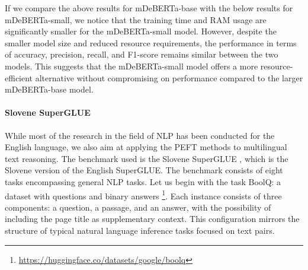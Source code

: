 If we compare the above results for mDeBERTa-base with the below results for mDeBERTa-small, we notice that the training time and RAM usage are significantly smaller for the mDeBERTa-small model. However, despite the smaller model size and reduced resource requirements, the performance in terms of accuracy, precision, recall, and F1-score remains similar between the two models. This suggests that the mDeBERTa-small model offers a more resource-efficient alternative without compromising on performance compared to the larger mDeBERTa-base model.

\begin{table}[htbp]
    \centering
    \caption{Performance of Full Finetuning vs PEFT methods on CoNLL-2012 for mDeBERTa-small}
    \label{tab:comparison}
\end{table}

\paragraph{Slovene SuperGLUE} While most of the research in the field of NLP has been conducted for the English language, we also aim at applying the PEFT methods to multilingual text reasoning. The benchmark used is the Slovene SuperGLUE \cite{robnik2022superglue}, which is the Slovene version of the English SuperGLUE. The benchmark consists of eight tasks encompassing general NLP tasks. Let us begin with the task BoolQ: a dataset with questions and binary answers \footnote{\url{https://huggingface.co/datasets/google/boolq}}. Each instance consists of three components: a question, a passage, and an answer, with the possibility of including the page title as supplementary context. This configuration mirrors the structure of typical natural language inference tasks focused on text pairs.

